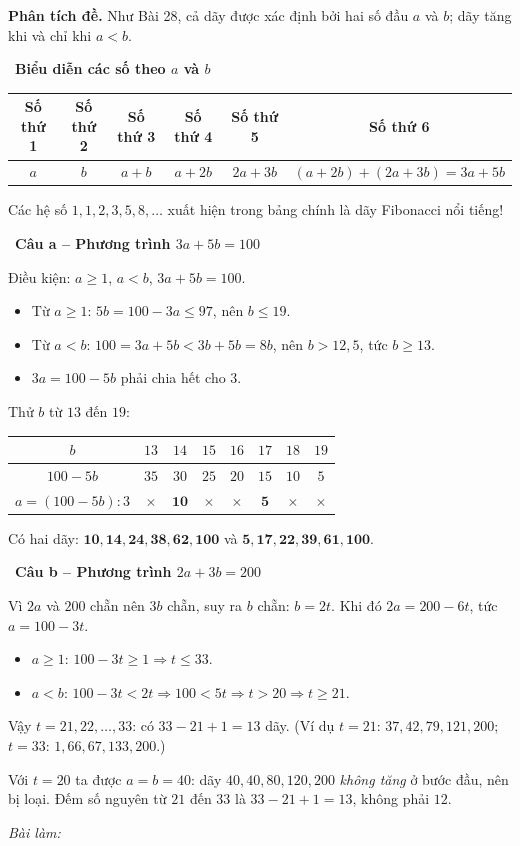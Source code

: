 \documentclass[11pt]{article}
\newif\ifsol \solfalse
\newcommand{\probsol}[1]{%
  \begin{lrbox}{\solmeasure}\begin{minipage}{\dimexpr\linewidth-24pt\relax}#1\end{minipage}\end{lrbox}%
  \ifsol
    \begin{solbox}#1\end{solbox}%
  \else
    \setlength{\solht}{\dimexpr\ht\solmeasure+\dp\solmeasure+0.85cm\relax}%
    \ifdim\solht<1.35cm\setlength{\solht}{1.35cm}\fi
    \ifdim\solht>\StudentMaxWork\setlength{\solht}{\StudentMaxWork}\fi
    \begin{tcolorbox}[colback=white,colframe=Line,boxrule=0.8pt,arc=5pt,
      left=8pt,right=8pt,top=4pt,bottom=4pt,height=\solht]{\footnotesize\color{Slate}\itshape\WorkWord}\end{tcolorbox}%
  \fi}
\newlength{\StudentMaxWork}\setlength{\StudentMaxWork}{7.5cm}
\newcommand{\step}[2]{\par\smallskip\noindent{\bfseries\color{tmBlue!85!black}\StepWord~#1.}\ {\bfseries #2}\par\nopagebreak}
\def\WorkWord{Bài làm:}
\def\StepWord{Bước}
\begin{document}
\probsol{
\textbf{Phân tích đề.} Như Bài 28, cả dãy được xác định bởi hai số đầu $a$ và $b$; dãy tăng khi và chỉ khi $a<b$.

\step{1}{Biểu diễn các số theo $a$ và $b$}
\begin{center}\small
\begin{tabular}{|c|c|c|c|c|c|}
\hline
\rowcolor{tmBlue!10}Số thứ 1 & Số thứ 2 & Số thứ 3 & Số thứ 4 & Số thứ 5 & Số thứ 6\\ \hline
$a$ & $b$ & $a+b$ & $a+2b$ & $2a+3b$ & $(a+2b)+(2a+3b)=3a+5b$\\ \hline
\end{tabular}
\end{center}
\begin{tipbox}Các hệ số $1,1,2,3,5,8,\dots$ xuất hiện trong bảng chính là dãy Fibonacci nổi tiếng!\end{tipbox}

\step{2}{Câu a -- Phương trình $3a+5b=100$}
Điều kiện: $a\ge 1$, $a<b$, $3a+5b=100$.
\begin{itemize}[leftmargin=1.3em,itemsep=1pt]
\item Từ $a\ge 1$: $5b=100-3a\le 97$, nên $b\le 19$.
\item Từ $a<b$: $100=3a+5b<3b+5b=8b$, nên $b>12{,}5$, tức $b\ge 13$.
\item $3a=100-5b$ phải chia hết cho $3$.
\end{itemize}
Thử $b$ từ $13$ đến $19$:
\begin{center}\small
\begin{tabular}{|c|c|c|c|c|c|c|c|}
\hline
\rowcolor{tmBlue!10}$b$ & $13$ & $14$ & $15$ & $16$ & $17$ & $18$ & $19$\\ \hline
$100-5b$ & $35$ & $30$ & $25$ & $20$ & $15$ & $10$ & $5$\\ \hline
$a=(100-5b):3$ & $\times$ & $\mathbf{10}$ & $\times$ & $\times$ & $\mathbf{5}$ & $\times$ & $\times$\\ \hline
\end{tabular}
\end{center}
Có hai dãy: $\mathbf{10, 14, 24, 38, 62, 100}$ và $\mathbf{5, 17, 22, 39, 61, 100}$.

\step{3}{Câu b -- Phương trình $2a+3b=200$}
Vì $2a$ và $200$ chẵn nên $3b$ chẵn, suy ra $b$ chẵn: $b=2t$. Khi đó $2a=200-6t$, tức $a=100-3t$.
\begin{itemize}[leftmargin=1.3em,itemsep=1pt]
\item $a\ge 1$: $100-3t\ge 1 \Rightarrow t\le 33$.
\item $a<b$: $100-3t<2t \Rightarrow 100<5t \Rightarrow t>20 \Rightarrow t\ge 21$.
\end{itemize}
Vậy $t=21,22,\dots,33$: có $33-21+1=13$ dãy. (Ví dụ $t=21$: $37, 42, 79, 121, 200$; $t=33$: $1, 66, 67, 133, 200$.)
\begin{warnbox}Với $t=20$ ta được $a=b=40$: dãy $40,40,80,120,200$ \emph{không tăng} ở bước đầu, nên bị loại. Đếm số nguyên từ $21$ đến $33$ là $33-21+1=13$, không phải $12$.\end{warnbox}

}
\end{document}
